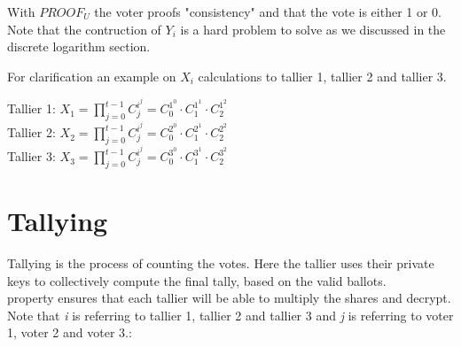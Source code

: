  With \begin{math} PROOF_U \end{math} the voter proofs "consistency" and that the vote is either 1 or 0.\\

\noindent
Note that the contruction of $Y_i$ is a hard problem to solve as we discussed in the discrete logarithm section. 

 For clarification an example on \begin{math}X_i\end{math} calculations to tallier 1, tallier 2 and tallier 3.
\begin{center}
Tallier 1: \begin{math}X_1=\prod\limits_{j=0}^{t-1} C_j^{i^j} = C_0^{1^0}  \cdot  C_1^{1^1}  \cdot  C_2^{1^2}\end{math}\\
Tallier 2: \begin{math}X_2=\prod\limits_{j=0}^{t-1} C_j^{i^j} = C_0^{2^0}  \cdot  C_1^{2^1}  \cdot  C_2^{2^2}\end{math}\\
Tallier 3: \begin{math}X_3=\prod\limits_{j=0}^{t-1} C_j^{i^j} = C_0^{3^0}  \cdot  C_1^{3^1}  \cdot  C_2^{3^2}\end{math}
\end{center}

\section{Tallying}
Tallying is the process of counting the votes. Here the tallier uses their private keys to collectively compute the final tally, based on the valid ballots.\\


\noindent
{} property ensures that each tallier will  be able to multiply the shares and decrypt. Note that \textit{i} is referring to tallier 1, tallier  2 and tallier 3 and \textit{j} is referring to voter 1, voter 2 and voter 3.:\\

